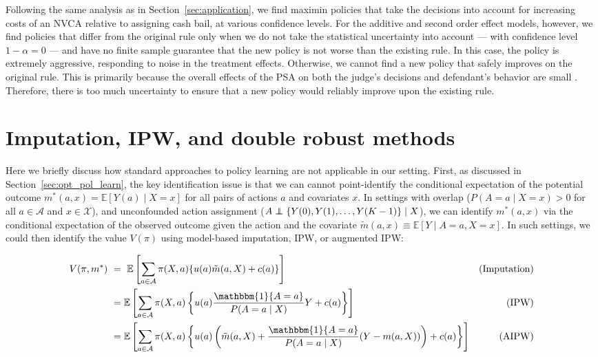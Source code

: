 \documentclass[12pt]{article}
\theoremstyle{definition}
\newcommand\indep{\protect\mathpalette{\protect\independenT}{\perp}}
\def\independenT#1#2{\mathrel{\rlap{$#1#2$}\mkern2mu{#1#2}}}
\newcommand{\bbone}{\ensuremath{\mathbbm{1}}}
\newcommand{\E}{\ensuremath{\mathbb{E}}}
\newcommand{\<}{\langle}
\renewcommand{\>}{\rangle}
\begin{document}
Following the same analysis as in Section~\ref{sec:application}, we
find maximin policies that take the decisions into account for
increasing costs of an NVCA relative to assigning cash bail, at
various confidence levels. For the additive and second order effect
models, however, we find policies that differ from the original rule
only when we do not take the statistical uncertainty into account ---
with confidence level $1 - \alpha = 0$ --- and have no finite sample
guarantee that the new policy is not worse than the existing rule. In
this case, the policy is extremely aggressive, responding to noise in
the treatment effects. Otherwise, we cannot find a new policy that
safely improves on the original rule. This is primarily because the
overall effects of the PSA on both the judge's decisions and
defendant's behavior are small \citep{Imai2020}. Therefore, there is
too much uncertainty to ensure that a new policy would reliably
improve upon the existing rule.
  

\section{Imputation, IPW, and double robust methods}
\label{sec:impute}

Here we briefly discuss how standard approaches to policy learning are not
applicable in our setting.
First, as discussed in Section~\ref{sec:opt_pol_learn}, the key identification
issue is that we can cannot point-identify the conditional expectation of the
potential outcome $m^\ast(a, x) = \E[Y(a) \mid X = x]$ for all pairs of actions
$a$ and covariates $x$.
In settings with overlap ($P(A = a \mid X = x) > 0$ for all $a \in \mathcal{A}$
and $x \in \mathcal{X}$), and unconfounded action assignment
($A \indep \{Y(0), Y(1),\ldots,Y(K-1)\} \mid X$), we can identify $m^\ast(a, x)$
via the conditional expectation of the observed outcome given the action and
the covariate
$\tilde{m}(a,x) \equiv \E[Y \mid A = a, X = x]$.
In such settings, we could then identify the value $V(\pi)$ using model-based
imputation, IPW, or augmented IPW:


\begin{align*}
  V(\pi, m^\ast) \ & = \ \E\left[\sum_{a \in
      \mathcal{A}} \pi(X, a) \{u(a) \tilde{m}(a, X) + c(a)\}\right] & \text{(Imputation)}\\
      & = \E\left[\sum_{a \in
      \mathcal{A}} \pi(X, a) \left\{u(a) \frac{\bbone\{A = a\}}{P(A = a \mid X)}Y + c(a)\right\}\right] & \text{(IPW)}\\
      & = \E\left[\sum_{a \in
      \mathcal{A}} \pi(X, a) \left\{u(a) \left(\tilde{m}(a, X) + \frac{\bbone\{A = a\}}{P(A = a \mid X)}(Y - m(a, X))\right) + c(a)\right\}\right] & \text{(AIPW)}
\end{align*}
\end{document}

